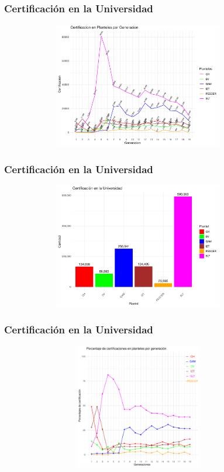 \documentclass[xcolor=dvipsnames]{beamer}
\begin{document}
\begin{frame}\frametitle{Certificaci\'on en la Universidad}
\textbf{
}
\begin{figure}[H]
\centering
\includegraphics[width=10cm,height=5.5cm]{Imagenes/graficoCertificacionPlantelGeneracion.pdf}
\end{figure}
\end{frame}

\begin{frame}\frametitle{Certificaci\'on en la Universidad}
\textbf{
}
\begin{figure}[H]
\centering
\includegraphics[width=10cm,height=5.5cm]{Imagenes/graficoCertificacionesPlanteles.pdf}
\end{figure}
\end{frame}


\begin{frame}\frametitle{Certificaci\'on en la Universidad}
\textbf{
}
\begin{figure}[H]
\centering
\includegraphics[width=10cm,height=5.5cm]{Imagenes/graficoPorcentajesPlantel.pdf}
\end{figure}
\end{frame}
\end{document}
